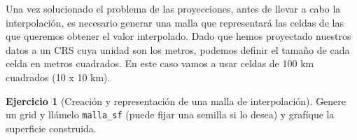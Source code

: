\documentclass[
]{book}
\newenvironment{Shaded}{\begin{snugshade}}{\end{snugshade}}
\newcommand{\AttributeTok}[1]{\textcolor[rgb]{0.77,0.63,0.00}{#1}}
\newcommand{\CommentTok}[1]{\textcolor[rgb]{0.56,0.35,0.01}{\textit{#1}}}
\newcommand{\DecValTok}[1]{\textcolor[rgb]{0.00,0.00,0.81}{#1}}
\newcommand{\FunctionTok}[1]{\textcolor[rgb]{0.00,0.00,0.00}{#1}}
\newcommand{\NormalTok}[1]{#1}
\newcommand{\OtherTok}[1]{\textcolor[rgb]{0.56,0.35,0.01}{#1}}
\newcommand{\SpecialCharTok}[1]{\textcolor[rgb]{0.00,0.00,0.00}{#1}}
\newcommand{\StringTok}[1]{\textcolor[rgb]{0.31,0.60,0.02}{#1}}
\theoremstyle{definition}
\theoremstyle{definition}
\theoremstyle{definition}
\newtheorem{exercise}{Ejercicio}[chapter]
\theoremstyle{definition}
\theoremstyle{remark}
\begin{document}
\begin{Shaded}
\end{Shaded}

Una vez solucionado el problema de las proyecciones, antes de llevar a cabo la
interpolación, es necesario generar una malla que representará las celdas de las
que queremos obtener el valor interpolado. Dado que hemos proyectado nuestros
datos a un CRS cuya unidad son los metros, podemos definir el tamaño de cada
celda en metros cuadrados. En este caso vamos a usar celdas de 100 km cuadrados
(10 x 10 km).

\begin{exercise}[Creación y representación de una malla de interpolación]
\protect\hypertarget{exr:ex12}{}\label{exr:ex12}Genere un grid y llámelo \texttt{malla\_sf} (puede fijar una semilla si lo desea) y
grafíque la superficie construida.
\end{exercise}
\end{document}
